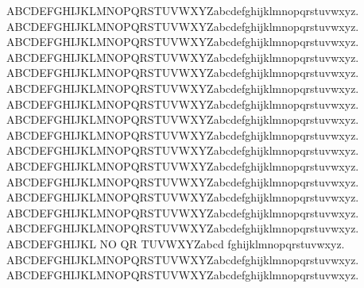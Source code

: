 \multirm  ABCDEFGHIJKLMNOPQRSTUVWXYZabcdefghijklmnopqrstuvwxyz.
\multiol  ABCDEFGHIJKLMNOPQRSTUVWXYZabcdefghijklmnopqrstuvwxyz.
\multitR   ABCDEFGHIJKLMNOPQRSTUVWXYZabcdefghijklmnopqrstuvwxyz.
\multitd   ABCDEFGHIJKLMNOPQRSTUVWXYZabcdefghijklmnopqrstuvwxyz.
\multitset ABCDEFGHIJKLMNOPQRSTUVWXYZabcdefghijklmnopqrstuvwxyz.
\multitM   ABCDEFGHIJKLMNOPQRSTUVWXYZabcdefghijklmnopqrstuvwxyz.
\multibaM   ABCDEFGHIJKLMNOPQRSTUVWXYZabcdefghijklmnopqrstuvwxyz.
\multitrM   ABCDEFGHIJKLMNOPQRSTUVWXYZabcdefghijklmnopqrstuvwxyz.
\multimc   ABCDEFGHIJKLMNOPQRSTUVWXYZabcdefghijklmnopqrstuvwxyz.
\multiop   ABCDEFGHIJKLMNOPQRSTUVWXYZabcdefghijklmnopqrstuvwxyz.
\multids   ABCDEFGHIJKLMNOPQRSTUVWXYZabcdefghijklmnopqrstuvwxyz.
\multiset  ABCDEFGHIJKLMNOPQRSTUVWXYZabcdefghijklmnopqrstuvwxyz.
\multirsfs ABCDEFGHIJKLMNOPQRSTUVWXYZabcdefghijklmnopqrstuvwxyz.
\multipz   ABCDEFGHIJKLMNOPQRSTUVWXYZabcdefghijklmnopqrstuvwxyz.
\multiM    ABCDEFGHIJKLMNOPQRSTUVWXYZabcdefghijklmnopqrstuvwxyz.
\multiR    ABCDEFGHIJKL NO QR TUVWXYZabcd fghijklmnopqrstuvwxyz.
\multibb   ABCDEFGHIJKLMNOPQRSTUVWXYZabcdefghijklmnopqrstuvwxyz.
\multiRM   ABCDEFGHIJKLMNOPQRSTUVWXYZabcdefghijklmnopqrstuvwxyz.
\newcommand{\RRM}{\R{M}}
\newcommand{\RRP}{\R{P}}
\newcommand{\RRe}{\R{e}}
\newcommand{\RRS}{\R{S}}

\newcommand{\dotleq}{\buildrel \textstyle  .\over {\smash{\lower
      .2ex\hbox{\ensuremath\leqslant}}\vphantom{=}}}
\newcommand{\dotgeq}{\buildrel \textstyle  .\over {\smash{\lower
      .2ex\hbox{\ensuremath\geqslant}}\vphantom{=}}}

\DeclareMathOperator*{\argmin}{arg\,min}
\DeclareMathOperator*{\argmax}{arg\,max}


\newcommand{\esm}{\ensuremath}

\newcommand{\bM}{\begin{bmatrix}}
\newcommand{\eM}{\end{bmatrix}}
\newcommand{\bSM}{\left[\begin{smallmatrix}}
\newcommand{\eSM}{\end{smallmatrix}\right]}
\renewcommand*\env@matrix[1][*\c@MaxMatrixCols c]{%
  \hskip -\arraycolsep
  \let\@ifnextchar\new@ifnextchar
  \array{#1}}




